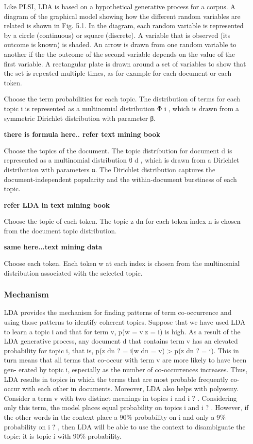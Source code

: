 Like PLSI, LDA is based on a hypothetical generative process for a corpus. A diagram of the graphical model showing how the different random variables are related is shown in Fig. 5.1. In the diagram, each random variable is represented by a circle (continuous) or square (discrete). A variable that is observed (its outcome is known) is shaded. An arrow is drawn from one random variable to another if the the outcome of the second variable depends on the value of the first variable. A rectangular plate is drawn around a set of variables to show that the set is repeated multiple times, as for example for each document or each token.

Choose the term probabilities for each topic. The distribution of terms for each topic i is represented as a multinomial
distribution Φ i , which is drawn from a symmetric Dirichlet distribution with parameter β.

\textbf{there is formula here.. refer text mining book}

Choose the topics of the document. The topic distribution for document d is represented as a multinomial distribution θ d , which is drawn from a Dirichlet distribution with parameters α. The Dirichlet distribution captures the document-independent popularity and the within-document burstiness of each topic.

\textbf{refer LDA in text mining book}

Choose the topic of each token. The topic z dn for each token index n is chosen from the document topic distribution.

\textbf{same here...text mining data}

Choose each token. Each token w at each index is chosen from the multinomial distribution associated with the selected topic.


\subsubsection{Mechanism} LDA provides the mechanism for finding patterns of term co-occurrence and using those patterns to identify coherent topics. Suppose that we have used LDA to learn a topic i and that for term v, p(w = v|z = i) is high. As a result of the LDA generative process, any document d that contains term v has an elevated probability for topic i, that is, p(z dn ? = i|w dn = v) > p(z dn ? = i). This in turn means that all terms that co-occur with term v are more likely to have been gen- erated by topic i, especially as the number of co-occurrences increases. Thus, LDA results in topics in which the terms that are most probable frequently co-occur with each other in documents. Moreover, LDA also helps with polysemy. Consider a term v with two distinct meanings in topics i and i ? . Considering only this term, the model places equal probability on topics i and i ? . However, if the other words in the context place a 90\% probability on i and only a 9\% probability on i ? , then LDA will be able to use the context to disambiguate the topic: it is topic i with 90\% probability.

